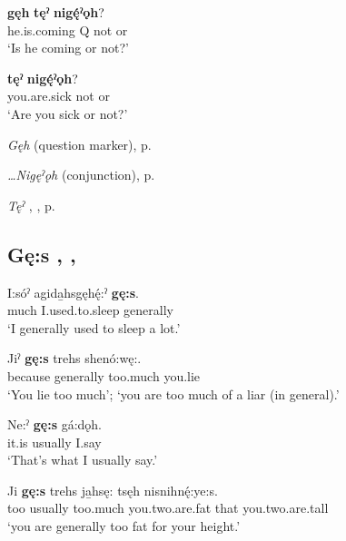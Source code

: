 \ea
\label{ex:gpar62}
\gll [Da̱héˀ] \textbf{gęh} \textbf{tęˀ} \textbf{nigę́ˀǫh}?\\
he.is.coming Q not or\\
\glt ‘Is he coming or not?’
\z


\ea
\label{ex:gpar63}
 \textbf{tęˀ} \textbf{nigę́ˀǫh}?\\
you.are.sick not or\\
\glt ‘Are you sick or not?’
\z


\begin{CayugaRelated}
\item \textit{Gęh}  (question marker), p. \pageref{p:[gęh] `Q’}\\
\item \textit{…Nigęˀǫh}  (conjunction), p. \pageref{p:[…nigęˀǫh]}\\
\item \textit{Tęˀ} , , p. \pageref{p:[tęˀ]}
\end{CayugaRelated}

\subsection*{\textbf{Gę:s} , , } \label{p:[gę:s]}

\ea
\label{ex:gpar64}
\gll I:sóˀ agida̱hsgęhę́:ˀ \textbf{gę:s}.\\
much I.used.to.sleep generally\\
\glt ‘I generally used to sleep a lot.’
\z


\ea
\label{ex:gpar65}
\gll Jiˀ \textbf{gę:s} trehs shenó:wę:.\\
because generally too.much you.lie\\
\glt ‘You lie too much’; `you are too much of a liar (in general).’
\z


\ea
\label{ex:gpar66}
\gll Ne:ˀ \textbf{gę:s} gá:dǫh.\\
it.is usually I.say\\
\glt ‘That’s what I usually say.’
\z


\ea
\label{ex:gpar67}
\gll Ji \textbf{gę:s} trehs ja̱hsę: tsęh nisnihnę́:ye:s.\\
too usually too.much you.two.are.fat that you.two.are.tall\\
\glt ‘you are generally too fat for your height.’
\z


